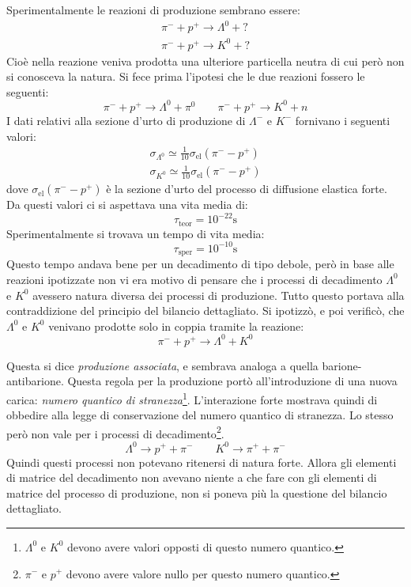 Sperimentalmente le reazioni di produzione sembrano essere:
\begin{gather}
\pi^-+p^+\rightarrow \Lambda^0+?\\
\pi^-+p^+\rightarrow K^0+?
\end{gather}
Cioè nella reazione veniva prodotta una ulteriore particella neutra di cui però
non si conosceva la natura. Si fece prima l'ipotesi che le due reazioni fossero
le seguenti:
\begin{equation}
\pi^-+p^+\rightarrow \Lambda^0+\pi^0\qquad \pi^-+p^+\rightarrow K^0+n
\end{equation}
I dati relativi alla sezione d'urto di produzione di $\Lambda^-$ e $K^-$
fornivano i seguenti valori:
\begin{gather}
\sigma_{\Lambda^0}\simeq\frac{1}{10}\sigma_\text{el}(\pi^--p^+)\\
\sigma_{K^0}\simeq \frac{1}{10}\sigma_\text{el}(\pi^--p^+)
\end{gather}
dove $\sigma_\text{el}(\pi^--p^+)$ è la sezione d'urto del processo di diffusione
elastica forte.
Da questi valori ci si aspettava una vita media di:
\[
\tau_{\text{teor}}=10^{-22}\si{\second}
\]
Sperimentalmente si trovava un tempo di vita media:
\[
\tau_{\text{sper}}=10^{-10}\si{\second}
\]
Questo tempo andava bene per un decadimento di tipo debole, però in base alle
reazioni ipotizzate non vi era motivo di pensare che i processi di decadimento
$\Lambda^0$ e $K^0$
avessero natura diversa dei processi di produzione. Tutto questo portava alla
contraddizione del principio del bilancio dettagliato.
Si ipotizzò, e poi verificò, che $\Lambda^0$ e $K^0$ venivano prodotte solo in
coppia tramite la reazione:
\[
\pi^-+p^+\rightarrow \Lambda^0+K^0
\]

Questa si dice \textit{produzione associata}, e sembrava analoga a quella barione-antibarione.
Questa regola per la produzione portò all'introduzione di una nuova carica:
\textit{numero quantico di stranezza}\footnote{$\Lambda^0$ e $K^0$ devono avere valori
opposti di questo numero quantico.}.
L'interazione forte mostrava quindi di obbedire alla legge di conservazione del
numero quantico di stranezza. Lo stesso però non vale per i processi di
decadimento\footnote{$\pi^-$ e $p^+$ devono avere valore nullo per questo numero
quantico.}.
\[
\Lambda^0\rightarrow p^++\pi^-\qquad K^0\rightarrow \pi^++\pi^-
\]
Quindi questi processi non potevano ritenersi di natura forte. Allora gli
elementi di matrice  del decadimento non avevano niente a che fare con gli
elementi di matrice  del processo di produzione, non si poneva più la questione
del bilancio dettagliato.

